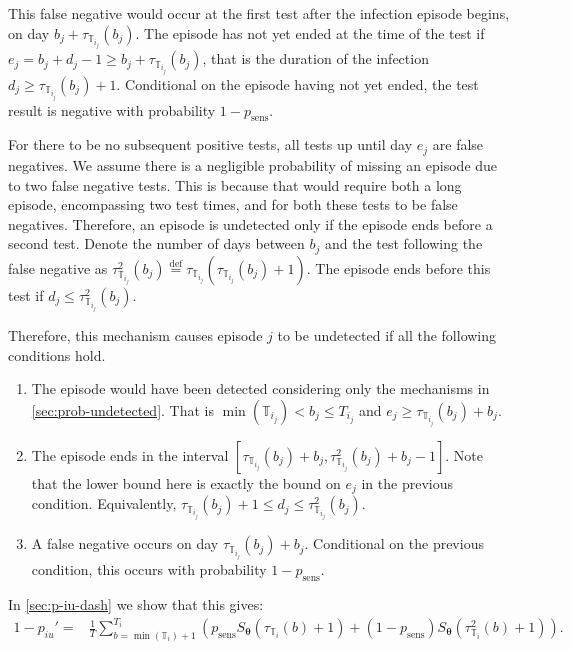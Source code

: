 \documentclass[12pt]{article}
\renewcommand{\vec}[1]{\bm{#1}}
\newcommand{\psens}{p_\text{sens}}
\newcommand{\sched}{\mathbb{T}}
\begin{document}
This false negative would occur at the first test after the infection episode begins, on day $b_j + \tau_{\sched_{i_j}}(b_j)$.
The episode has not yet ended at the time of the test if $e_j = b_j + d_j - 1 \geq b_j + \tau_{\sched_{i_j}}(b_j)$, that is the duration of the infection $d_j \geq \tau_{\sched_{i_j}}(b_j) + 1$.
Conditional on the episode having not yet ended, the test result is negative with probability $1 - \psens$.

For there to be no subsequent positive tests, all tests up until day $e_j$ are false negatives.
We assume there is a negligible probability of missing an episode due to two false negative tests.
This is because that would require both a long episode, encompassing two test times, and for both these tests to be false negatives.
Therefore, an episode is undetected only if the episode ends before a second test.
Denote the number of days between $b_j$ and the test following the false negative as $\tau^2_{\sched_{i_j}}(b_j) \stackrel{\text{def}}{=} \tau_{\sched_{i_j}}(\tau_{\sched_{i_j}}(b_j) + 1)$.
The episode ends before this test if $d_j \leq \tau^2_{\sched_{i_j}}(b_j)$.

Therefore, this mechanism causes episode $j$ to be undetected if all the following conditions hold.
\begin{enumerate}
    \item The episode would have been detected considering only the mechanisms in \cref{sec:prob-undetected}. That is $\min(\sched_{i_j}) < b_j \leq T_{i_j}$ and $e_j \geq \tau_{\sched_{i_j}}(b_j) + b_j$.
    \item The episode ends in the interval $[\tau_{\sched_{i_j}}(b_j) + b_j, \tau^2_{\sched_{i_j}}(b_j) + b_j - 1]$.
      Note that the lower bound here is exactly the bound on $e_j$ in the previous condition.
      Equivalently, $\tau_{\sched_{i_j}}(b_j) + 1 \leq d_j \leq \tau^2_{\sched_{i_j}}(b_j)$.
    \item A false negative occurs on day $\tau_{\sched_{i_j}}(b_j) + b_j$. Conditional on the previous condition, this occurs with probability $1 - \psens$.
\end{enumerate}

In \cref{sec:p-iu-dash} we show that this gives:
\begin{align}
1 - p_{iu}'
=& \frac{1}{T} \sum_{b=\min(\sched_{i}) + 1}^{T_{i}} \left( p_\text{sens} S_{\vec{\theta}}(\tau_{\sched_{i}}(b) + 1) + (1 - p_\text{sens}) S_{\vec{\theta}}(\tau^2_{\sched_{i}}(b) + 1)\right).
\label{imperf-test:eq:pit-prime}
\end{align}
\end{document}
